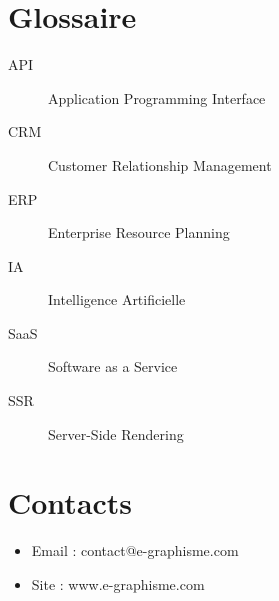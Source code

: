 \documentclass[12pt,a4paper,oneside]{book}
\begin{document}
\appendix

\chapter{Glossaire}
\begin{description}
\item[API] Application Programming Interface
\item[CRM] Customer Relationship Management
\item[ERP] Enterprise Resource Planning
\item[IA] Intelligence Artificielle
\item[SaaS] Software as a Service
\item[SSR] Server-Side Rendering
\end{description}

\chapter{Contacts}
\begin{itemize}
\item Email : contact@e-graphisme.com
\item Site : www.e-graphisme.com
\end{itemize}
\end{document}

